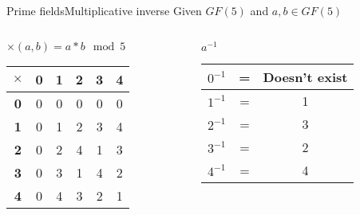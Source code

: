\begin{frame}[t]{Prime fields}{Multiplicative inverse}
	Given $GF(5)$ and $a, b \in GF(5)$
	\medskip
	
	\begin{columns}
		\begin{column}{0.5\textwidth}
			\centering $\times(a, b) = a * b \mod 5$		
			\begin{table}[]
				\begin{tabular}{c|ccccc}
					\textbf{$\times$} & \textbf{0} & \textbf{1} & \textbf{2} & \textbf{3} & \textbf{4} \\ \hline
					\textbf{0} & 0          & 0          & 0          & 0          & 0          \\
					\textbf{1} & 0          & 1          & 2          & 3          & 4          \\
					\textbf{2} & 0          & 2          & 4          & 1          & 3          \\
					\textbf{3} & 0          & 3          & 1          & 4          & 2          \\
					\textbf{4} & 0          & 4          & 3          & 2          & 1         
				\end{tabular}
			\end{table}
		\end{column}
		\begin{column}{0.5\textwidth}  %
			\centering $a^{-1}$		
			\begin{table}[]
				\begin{tabular}{c|cc}
					$0^{-1}$  & = & Doesn't exist \\ \hline
					$1^{-1}$  & = & 1 \\
					$2^{-1}$  & = & 3 \\
					$3^{-1}$  & = & 2 \\
					$4^{-1}$  & = & 4
				\end{tabular}
			\end{table}
		\end{column}
	\end{columns}
\end{frame}

